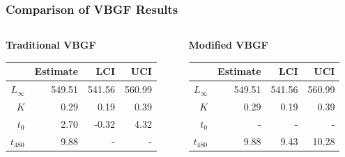 \documentclass[xcolor=dvipsnames]{beamer}\usepackage[]{graphicx}\usepackage[]{color}
\begin{document}
\begin{frame}[fragile, t]
\frametitle{Comparison of VBGF Results}
\begin{columns}
\begin{column}{0.5\textwidth}
\textbf{Traditional VBGF}
\begin{table}[ht]
\centering
\begin{tabular}{rrrr}
  \hline
 & Estimate & LCI & UCI \\ 
  \hline
$L_{\infty}$ & 549.51 & 541.56 & 560.99 \\ 
  $K$ & 0.29 & 0.19 & 0.39 \\ 
  $t_{0}$ & 2.70 & -0.32 & 4.32 \\ 
  $t_{480}$ & 9.88 & - & - \\ 
   \hline
\end{tabular}
\end{table}

\end{column}
\begin{column}{0.5\textwidth}
\textbf{Modified VBGF}
\begin{table}[ht]
\centering
\begin{tabular}{rrrr}
  \hline
 & Estimate & LCI & UCI \\ 
  \hline
$L_{\infty}$ & 549.51 & 541.56 & 560.99 \\ 
  $K$ & 0.29 & 0.19 & 0.39 \\ 
  $t_{0}$ & - & - & - \\ 
  $t_{480}$ & 9.88 & 9.43 & 10.28 \\ 
   \hline
\end{tabular}
\end{table}

\end{column}
\end{columns}
\end{frame}
\end{document}
